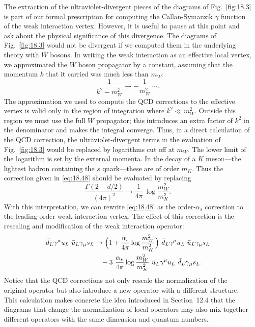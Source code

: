 The extraction of the ultraviolet-divergent pieces of the diagrams of
Fig.~\ref{fig:18.3} is part of our formal prescription for computing the
Callan-Symanzik $\gamma$ function of the weak interaction vertex.  However, it
is useful to pause at this point and ask about the physical significance of
this divergence.  The diagrams of Fig.~\ref{fig:18.3} would not be divergent
if we computed them in the underlying theory with $W$ bosons.  In writing
the weak interaction as an effective local vertex, we approximated the $W$
boson propagator by a constant, assuming that the momentum $k$ that it
carried was much less than $m_W$:
\begin{equation}
  \frac{1}{k^2-m_W^2} \to -\frac{1}{m_W^2}\ \cdots .
  \label{eq:18.49}
\end{equation}
The approximation we used to compute the QCD corrections to the effective
vertex is valid only in the region of integration where $k^2 \ll m_W^2$.
Outside this region we must use the full $W$ propagator; this introduces an
extra factor of $k^2$ in the denominator and makes the integral converge.
Thus, in a direct calculation of the QCD correction, the ultraviolet-divergent
terms in the evaluation of Fig.~\ref{fig:18.3} would be replaced by
logarithms cut off at $m_W$.  The lower limit of the logarithm is set by the
external momenta.  In the decay of a $K$ meson---the lightest hadron
containing the $s$ quark---these are of order $m_K$.  Thus the correction
given in \eqref{eq:18.48} should be evaluated by replacing
\begin{equation}
  \frac{\Gamma(2-d/2)}{(4\pi)^2} \to \frac{1}{4\pi}\ \log\frac{m_W^2}{m_K^2}
  .
  \label{eq:18.50}
\end{equation}
With this interpretation, we can rewrite \eqref{eq:18.48} as the
order-$\alpha_s$ correction to the leading-order weak interaction vertex.  The
effect of this correction is the rescaling and modification of the weak
interaction operator:
\begin{equation}
  \begin{aligned}
    \bar{d}_L\gamma^\mu u_L\ \bar{u}_L\gamma_\mu s_L
    &\to \Bigl( 1 + \frac{\alpha_s}{4\pi}\log\frac{m_W^2}{m_K^2} \Bigr)\
      \bar{d}_L\gamma^\mu u_L\ \bar{u}_L\gamma_\mu s_L\\
    &\quad - 3\ \frac{\alpha_s}{4\pi}\log\frac{m_W^2}{m_K^2}\
      \bar{u}_L\gamma^\mu u_L\ \bar{d}_L\gamma_\mu s_L .
  \end{aligned}
  \label{eq:18.51}
\end{equation}
Notice that the QCD corrections not only rescale the normalization of the
original operator but also introduce a new operator with a different
structure.  This calculation makes concrete the idea introduced in
Section~12.4 that the diagrams that change the normalization of local
operators may also mix together different operators with the same dimension
and quantum numbers.

